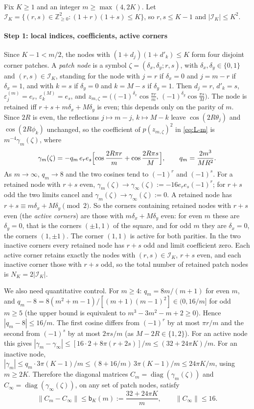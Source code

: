 \documentclass[preprint,12pt,a4paper]{elsarticle}
\theoremstyle{remark}
\DeclareMathOperator{\diag}{diag}
\begin{document}
Fix $K\ge1$ and an integer $m\ge\max(4,2K)$. Let
$\mathcal I_K=\{(r,s)\in\mathbb Z_{\ge0}^2:(1+r)(1+s)\le K\}$, so $r,s\le K-1$ and
$|\mathcal I_K|\le K^2$.

\paragraph{Step 1: local indices, coefficients, active corners}
Since $K-1<m/2$, the nodes with $(1+d_j)(1+d'_k)\le K$ form four disjoint
corner patches. A \emph{patch node} is a symbol $\zeta=(\delta_x,\delta_y;r,s)$,
with $\delta_x,\delta_y\in\{0,1\}$ and $(r,s)\in \mathcal I_K$, standing for the node with
$j=r$ if $\delta_x=0$ and $j=m-r$ if $\delta_x=1$, and with $k=s$ if
$\delta_y=0$ and $k=M-s$ if $\delta_y=1$. Then $d_j=r$, $d'_k=s$,
$\varepsilon^{(m)}_j=e_r$, $\varepsilon^{(M)}_k=e_s$, and
$z_{m,\zeta}=\bigl((-1)^{\delta_x}\cos\frac{\pi r}m,\,(-1)^{\delta_y}\cos\frac{\pi s}M\bigr)$.
The node is retained iff $r+s+m\delta_x+M\delta_y$ is even; this depends
only on the parity of $m$. Since $2R$ is even, the reflections
$j\mapsto m-j$, $k\mapsto M-k$ leave $\cos(2R\theta_j)$ and $\cos(2R\phi_k)$
unchanged, so the coefficient of $p(z_{m,\zeta})^2$ in \eqref{eq:L-m} is
$m^{-4}\gamma_m(\zeta)$, where
\[
 \gamma_m(\zeta)=-q_m\,e_re_s\Bigl[\cos\frac{2R\pi r}m+\cos\frac{2R\pi s}M\Bigr],\qquad
 q_m=\frac{2m^3}{MR^2}.
\]
As $m\to\infty$, $q_m\to8$ and the two cosines tend to $(-1)^r$ and $(-1)^s$.
For a retained node with $r+s$ even, $\gamma_m(\zeta)\to\gamma_\infty(\zeta):=-16e_re_s(-1)^r$;
for $r+s$ odd the two limits cancel and $\gamma_m(\zeta)\to\gamma_\infty(\zeta):=0$.
A retained node has $r+s\equiv m\delta_x+M\delta_y\pmod2$. So the corners
containing retained nodes with $r+s$ even (the \emph{active corners}) are those
with $m\delta_x+M\delta_y$ even: for even $m$ these are $\delta_y=0$, that is the
corners $(\pm1,1)$ of the square, and for odd $m$ they are $\delta_x=0$, the
corners $(1,\pm1)$. The corner $(1,1)$ is active for both parities. In the two
inactive corners every retained node has $r+s$ odd and limit coefficient zero.
Each active corner retains exactly the nodes with $(r,s)\in \mathcal I_K$, $r+s$ even, and each
inactive corner those with $r+s$ odd, so the total number of retained patch nodes
is $N_K=2|\mathcal I_K|$.

We also need quantitative control. For $m\ge4$: $q_m=8m/(m+1)$ for even $m$, and
$q_m-8=8(m^2+m-1)/[(m+1)(m-1)^2]\in(0,16/m]$ for odd $m\ge5$ (the upper bound
is equivalent to $m^3-3m^2-m+2\ge0$). Hence $|q_m-8|\le16/m$. The first cosine
differs from $(-1)^r$ by at most $\pi r/m$ and the second from $(-1)^s$ by at
most $2\pi s/m$ (as $M-2R\in\{1,2\}$). For an active node this gives
$|\gamma_m-\gamma_\infty|\le[16\cdot2+8\pi(r+2s)]/m\le(32+24\pi K)/m$. For an
inactive node, $|\gamma_m|\le q_m\cdot3\pi(K-1)/m\le(8+16/m)\,3\pi(K-1)/m
\le24\pi K/m$, using $m\ge2K$. Therefore the diagonal matrices
$C_m=\diag(\gamma_m(\zeta))$ and $C_\infty=\diag(\gamma_\infty(\zeta))$, on any
set of patch nodes, satisfy
\begin{equation}\label{eq:coeff-diff}
 \|C_m-C_\infty\|\le\mathsf b_K(m):=\frac{32+24\pi K}m,\qquad\|C_\infty\|\le16 .
\end{equation}
\end{document}
